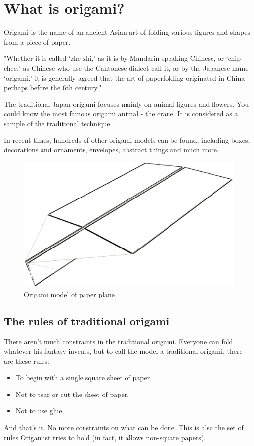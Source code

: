 \chapter{What is origami?}
Origami is the name of an ancient Asian art of folding various figures and shapes from a piece of paper.

"Whether it is called `zhe zhi,' as it is by Mandarin-speaking Chinese, or `chip chee,' as Chinese who use the Cantonese dialect call it, or by the Japanese name `origami,' it is generally agreed that the art of paperfolding originated in China perhaps before the 6th century." \cite[p. 123]{temko}

The traditional Japan origami focuses mainly on animal figures and flowers. You could know the most famous origami animal - the crane. It is considered as a sample of the traditional technique.

In recent times, hundreds of other origami models can be found, including boxes, decorations and ornaments, envelopes, abstract things and much more. \cite{lang}

\begin{figure}
	\centering
	\includegraphics[width=15cm]{images/preview01}
	\caption{Origami model of paper plane}
\end{figure}

\section{The rules of traditional origami}
There aren't much constraints in the traditional origami. Everyone can fold whatever his fantasy invents, but to call the model a traditional origami, there are these rules: \cite{pen}
\begin{itemize}
\item To begin with a single square sheet of paper.
\item Not to tear or cut the sheet of paper.
\item Not to use glue.
\end{itemize}
And that's it. No more constraints on what can be done. This is also the set of rules Origamist tries to hold (in fact, it allows non-square papers).

